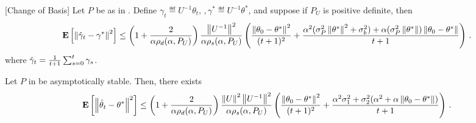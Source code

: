 \begin{theorem}\label{thm:simtran}[Change of Basis]
Let $P$ be as in . Define $\gamma_t\eqdef U^{-1}\theta_t,\,,\gamma^*\eqdef U^{-1}\theta^*$, and suppose if $P_U$ is positive definite, then
\begin{align}
\mathbf{E}\left[\left\| \hat{\gamma}_t-\gamma^*\right\|^2\right]
\leq
\left(1+\frac2{\alpha\rho_d(\alpha,P_U)}\right)\frac{\left\| U^{-1}\right\|^2}{\alpha \rho_s(\alpha,P_U)}
\left(\frac{\left\| \theta_0-\theta^*\right\|^2}{(t+1)^2}+ \frac{\alpha^2(\sigma_P^2\left\| \theta^*\right\|^2+\sigma_b^2)+\alpha (\sigma_P^2\left\| \theta^*\right\|)\left\| \theta_0-\theta^*\right\|}{t+1} \right)\,.
\end{align}
where $\hat{\gamma}_t=\frac{1}{t+1}\sum_{s=0}^t \gamma_s$.
\end{theorem}
\begin{corollary}\label{cor:as}
Let $P$ in  be asymptotically stable. Then, there exists
\begin{align}
\mathbf{E}\left[\left\| \hat{\theta}_t-\theta^*\right\|^2\right]
\leq
\left(1+\frac2{\alpha\rho_d(\alpha,P_U)}\right)\frac{\left\| U\right\|^2\left\| U^{-1}\right\|^2}{\alpha \rho_s(\alpha,P_U)} \left(\frac{\left\| \theta_0-\theta^*\right\|^2}{(t+1)^2}+ \frac{\alpha^2{\sigma}_1^2+ {\sigma}_2^2 (\alpha^2+\alpha \left\| \theta_0-\theta^*\right\|)}{t+1} \right)\,.
\end{align}
\end{corollary}
